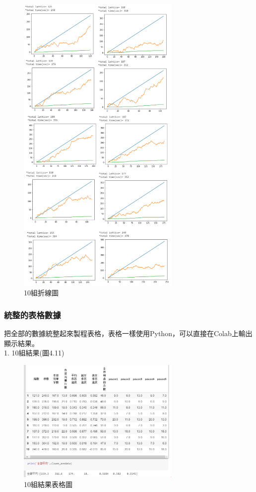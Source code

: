 	\begin{figure}[H] 
	\centering 
	\includegraphics[width=0.7\textwidth]{4_6.png} 
	\caption{10組折線圖} 
	\label{Fig.4.6} 
	\end{figure}

\subsubsection{統整的表格數據}
把全部的數據統整起來製程表格，表格一樣使用Python，可以直接在Colab上輸出顯示結果。\\
1. 10組結果(圖4.11)
	\begin{figure}[H] 
	\centering 
	\includegraphics[width=0.7\textwidth]{4_7.png} 
	\caption{10組結果表格圖} 
	\label{Fig.4.7} 
	\end{figure}

